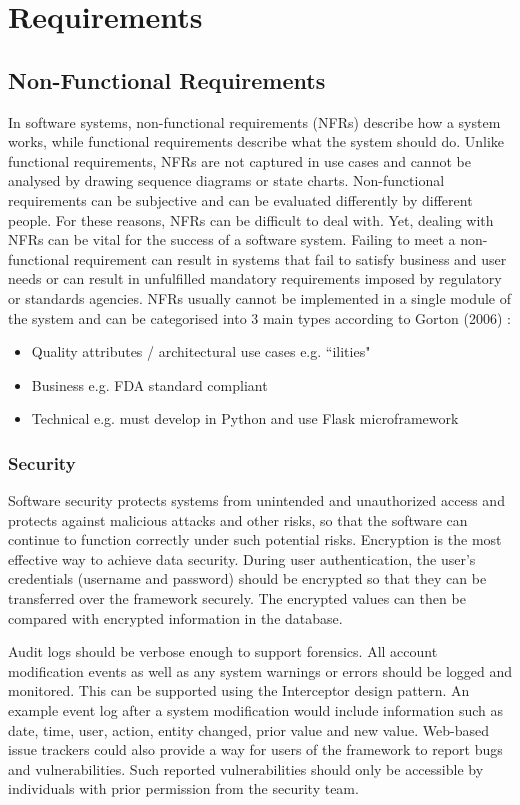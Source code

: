 \chapter{Requirements}


\section{Non-Functional Requirements}

In software systems, non-functional requirements (NFRs) describe how a system works, while functional requirements describe what the system should do. Unlike functional requirements, NFRs are not captured in use cases and cannot be analysed by drawing sequence diagrams or state charts. Non-functional requirements can be subjective and can be evaluated differently by different people. For these reasons, NFRs can be difficult to deal with. Yet, dealing with NFRs can be vital for the success of a software system. \cite{nfrs} Failing to meet a non-functional requirement can result in systems that fail to satisfy business and user needs or can result in unfulfilled mandatory requirements imposed by regulatory or standards agencies. NFRs usually cannot be implemented in a single module of the system and can be categorised into 3 main types according to Gorton (2006) \cite{sw-arch}:
\begin{itemize}
  \item Quality attributes / architectural use cases e.g. ``ilities"
  \item Business e.g. FDA standard compliant
  \item Technical e.g. must develop in Python and use Flask microframework
\end{itemize}

\subsection{Security}
Software security protects systems from unintended and unauthorized access and protects against malicious attacks and other risks, so that the software can continue to function correctly under such potential risks. Encryption is the most effective way to achieve data security. During user authentication, the user's credentials (username and password) should be encrypted so that they can be transferred over the framework securely. The encrypted values can then be compared with encrypted information in the database.

Audit logs should be verbose enough to support forensics. All account modification events as well as any system warnings or errors should be logged and monitored. This can be supported using the Interceptor design pattern. An example event log after a system modification would include information such as date, time, user, action, entity changed, prior value and new value. Web-based issue trackers could also provide a way for users of the framework to report bugs and vulnerabilities. Such reported vulnerabilities should only be accessible by individuals with prior permission from the security team.

